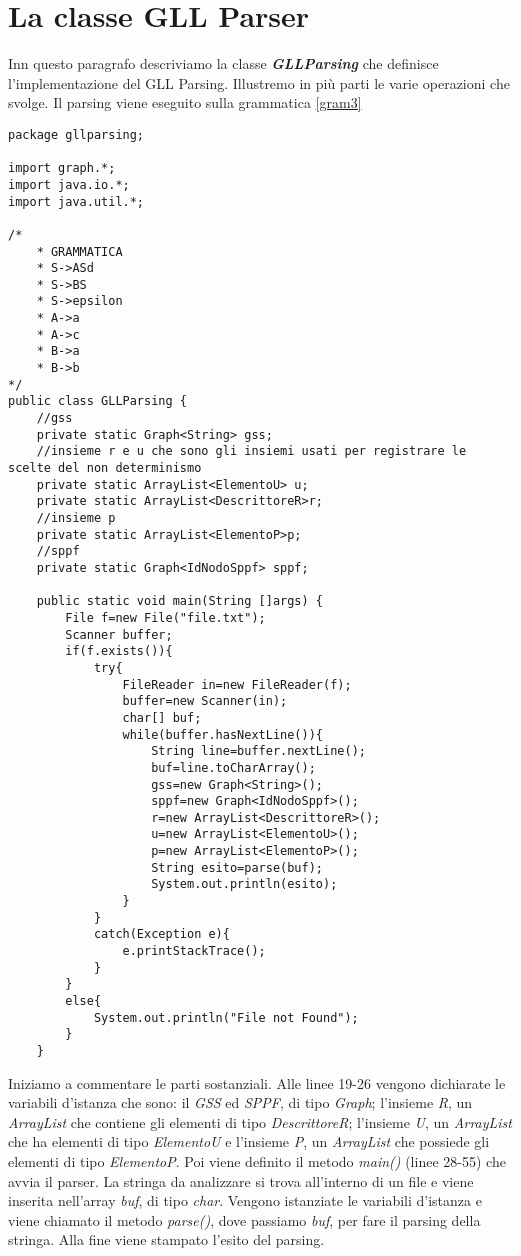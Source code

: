 \section{La classe GLL Parser}
Inn questo paragrafo descriviamo la classe \textbf{\textit{GLLParsing}} che definisce l'implementazione del GLL Parsing. Illustremo in più parti le varie operazioni che svolge. Il parsing viene eseguito sulla grammatica \ref{gram3} 
\begin{lstlisting}
package gllparsing;

import graph.*;
import java.io.*;
import java.util.*;
	
/*
	* GRAMMATICA
	* S->ASd
	* S->BS
	* S->epsilon
	* A->a
	* A->c
	* B->a
	* B->b
*/
public class GLLParsing {
	//gss
	private static Graph<String> gss;
	//insieme r e u che sono gli insiemi usati per registrare le scelte del non determinismo
	private static ArrayList<ElementoU> u;
	private static ArrayList<DescrittoreR>r;
	//insieme p
	private static ArrayList<ElementoP>p;
	//sppf
	private static Graph<IdNodoSppf> sppf;
	
	public static void main(String []args) {
		File f=new File("file.txt");
		Scanner buffer;
		if(f.exists()){
			try{
				FileReader in=new FileReader(f);
				buffer=new Scanner(in);
				char[] buf;
				while(buffer.hasNextLine()){
					String line=buffer.nextLine();
					buf=line.toCharArray();
					gss=new Graph<String>();
					sppf=new Graph<IdNodoSppf>();
					r=new ArrayList<DescrittoreR>();
					u=new ArrayList<ElementoU>();
					p=new ArrayList<ElementoP>();
					String esito=parse(buf);
					System.out.println(esito);
				}	
			}
			catch(Exception e){
				e.printStackTrace();
			}
		}
		else{
			System.out.println("File not Found");
		} 
	}	
\end{lstlisting}
Iniziamo a commentare le parti sostanziali. Alle linee 19-26 vengono dichiarate le variabili d'istanza che sono: il \textit{GSS} ed \textit{SPPF}, di tipo \textit{Graph}; l'insieme \textit{R}, un \textit{ArrayList} che contiene gli elementi di tipo \textit{DescrittoreR}; l'insieme \textit{U}, un \textit{ArrayList} che ha elementi di tipo \textit{ElementoU} e l'insieme \textit{P}, un \textit{ArrayList} che possiede gli elementi di tipo \textit{ElementoP}. Poi viene definito il metodo \textit{main()} (linee 28-55) che avvia il parser. La stringa da analizzare si trova all'interno di un file e viene inserita nell'array \textit{buf}, di tipo \textit{char}. Vengono istanziate le variabili d'istanza e viene chiamato il metodo \textit{parse()}, dove passiamo \textit{buf}, per fare il parsing della stringa. Alla fine viene stampato l'esito del parsing.\\
